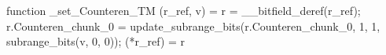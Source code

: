 function _set_Counteren_TM (r_ref, v) = {
    r = __bitfield_deref(r_ref);
    r.Counteren_chunk_0 = update_subrange_bits(r.Counteren_chunk_0, 1, 1, subrange_bits(v, 0, 0));
    (*r_ref) = r
}
